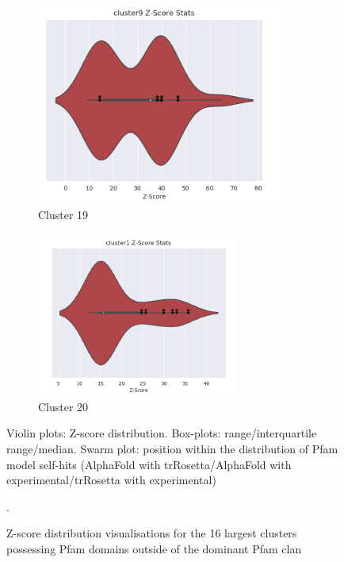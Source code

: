 \begin{figure}[htb]
\begin{subfigure}{0.2\textwidth}
  \includegraphics[width=\linewidth]{Pfam/cl19.png}
  \caption{Cluster 19}
  \label{fig:cl19}
\end{subfigure}\hfil %
\begin{subfigure}{0.2\textwidth}
  \includegraphics[width=\linewidth]{Pfam/cl20.png}
  \caption{Cluster 20}
  \label{fig:cl20}
\end{subfigure}\hfil %

\caption{Z-score distribution visualisations for the 16 largest clusters possessing Pfam domains outside of the dominant Pfam clan}
\small
\begin{flushleft}Violin plots: Z-score distribution. Box-plots: range/interquartile range/median. Swarm plot: position within the distribution of Pfam model self-hits (AlphaFold with trRosetta/AlphaFold with experimental/trRosetta with experimental) \end{flushleft}.
\label{fig:clusters}
\end{figure}

